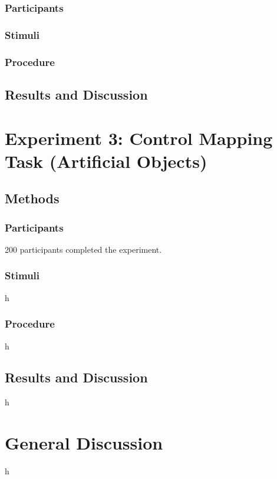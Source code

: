 \documentclass[man]{apa2}
\begin{document}
\subsubsection{Participants} 
\subsubsection{Stimuli}

\subsubsection{Procedure}


\subsection{Results and Discussion}

				
\section{Experiment 3: Control Mapping Task (Artificial Objects)}

\subsection{Methods}
\subsubsection{Participants} 200 participants completed the experiment.
\subsubsection{Stimuli} h

\subsubsection{Procedure}
h

\subsection{Results and Discussion}
h

\section{General Discussion}

h







\newpage
\theappendix 

\section{}
\end{document}
